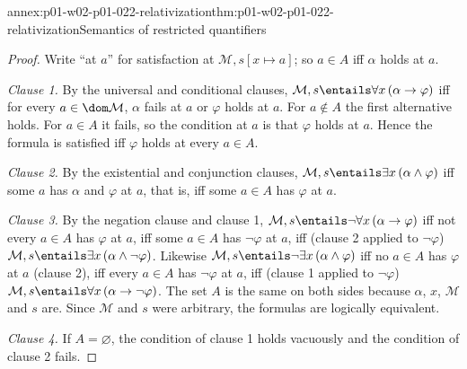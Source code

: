 \begin{annexitem}{annex:p01-w02-p01-022-relativization}{thm:p01-w02-p01-022-relativization}{Semantics of restricted quantifiers}
\begin{proof}
Write ``at \(a\)'' for satisfaction at \(\mathcal M,s[x\mapsto a]\); so
\(a\in A\) iff \(\alpha\) holds at \(a\).

\emph{Clause 1.} By the universal and conditional clauses,
\(\mathcal M,s\entails\forall x\,(\alpha\to\varphi)\) iff for every
\(a\in\dom\mathcal M\), \(\alpha\) fails at \(a\) or \(\varphi\) holds at
\(a\). For \(a\notin A\) the first alternative holds. For \(a\in A\) it
fails, so the condition at \(a\) is that \(\varphi\) holds at \(a\). Hence
the formula is satisfied iff \(\varphi\) holds at every \(a\in A\).

\emph{Clause 2.} By the existential and conjunction clauses,
\(\mathcal M,s\entails\exists x\,(\alpha\land\varphi)\) iff some \(a\) has
\(\alpha\) and \(\varphi\) at \(a\), that is, iff some \(a\in A\) has
\(\varphi\) at \(a\).

\emph{Clause 3.} By the negation clause and clause 1,
\(\mathcal M,s\entails\neg\forall x\,(\alpha\to\varphi)\) iff not every
\(a\in A\) has \(\varphi\) at \(a\), iff some \(a\in A\) has \(\neg\varphi\)
at \(a\), iff (clause 2 applied to \(\neg\varphi\))
\(\mathcal M,s\entails\exists x\,(\alpha\land\neg\varphi)\). Likewise
\(\mathcal M,s\entails\neg\exists x\,(\alpha\land\varphi)\) iff no
\(a\in A\) has \(\varphi\) at \(a\) (clause 2), iff every \(a\in A\) has
\(\neg\varphi\) at \(a\), iff (clause 1 applied to \(\neg\varphi\))
\(\mathcal M,s\entails\forall x\,(\alpha\to\neg\varphi)\). The set \(A\) is
the same on both sides because \(\alpha\), \(x\), \(\mathcal M\) and \(s\)
are. Since \(\mathcal M\) and \(s\) were arbitrary, the formulas are
logically equivalent.

\emph{Clause 4.} If \(A=\varnothing\), the condition of clause 1 holds
vacuously and the condition of clause 2 fails.
\end{proof}
\end{annexitem}


